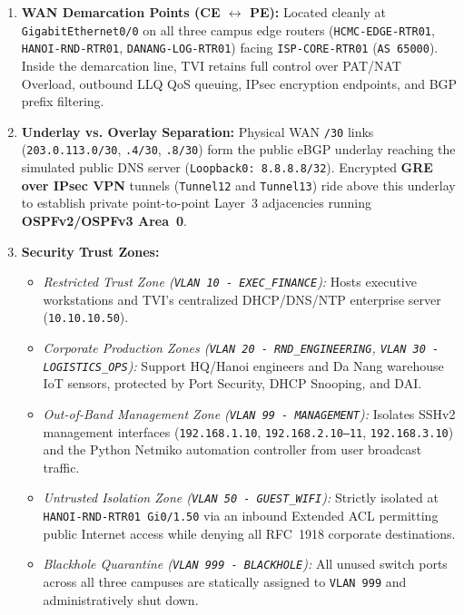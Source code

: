 \begin{enumerate}[leftmargin=1.5em, itemsep=3pt]
    \item \textbf{WAN Demarcation Points (CE $\leftrightarrow$ PE):} Located cleanly at \texttt{GigabitEthernet0/0} on all three campus edge routers (\texttt{HCMC-EDGE-RTR01}, \texttt{HANOI-RND-RTR01}, \texttt{DANANG-LOG-RTR01}) facing \texttt{ISP-CORE-RTR01} (\texttt{AS 65000}). Inside the demarcation line, TVI retains full control over PAT/NAT Overload, outbound LLQ QoS queuing, IPsec encryption endpoints, and BGP prefix filtering.
    \item \textbf{Underlay vs. Overlay Separation:} Physical WAN \texttt{/30} links (\texttt{203.0.113.0/30}, \texttt{.4/30}, \texttt{.8/30}) form the public eBGP underlay reaching the simulated public DNS server (\texttt{Loopback0: 8.8.8.8/32}). Encrypted \textbf{GRE over IPsec VPN} tunnels (\texttt{Tunnel12} and \texttt{Tunnel13}) ride above this underlay to establish private point-to-point Layer~3 adjacencies running \textbf{OSPFv2/OSPFv3 Area~0}.
    \item \textbf{Security Trust Zones:}
    \begin{itemize}[leftmargin=1.4em, itemsep=2pt]
        \item \emph{Restricted Trust Zone (\texttt{VLAN 10 - EXEC\_FINANCE}):} Hosts executive workstations and TVI's centralized DHCP/DNS/NTP enterprise server (\texttt{10.10.10.50}).
        \item \emph{Corporate Production Zones (\texttt{VLAN 20 - RND\_ENGINEERING}, \texttt{VLAN 30 - LOGISTICS\_OPS}):} Support HQ/Hanoi engineers and Da Nang warehouse IoT sensors, protected by Port Security, DHCP Snooping, and DAI.
        \item \emph{Out-of-Band Management Zone (\texttt{VLAN 99 - MANAGEMENT}):} Isolates SSHv2 management interfaces (\texttt{192.168.1.10}, \texttt{192.168.2.10--11}, \texttt{192.168.3.10}) and the Python Netmiko automation controller from user broadcast traffic.
        \item \emph{Untrusted Isolation Zone (\texttt{VLAN 50 - GUEST\_WIFI}):} Strictly isolated at \texttt{HANOI-RND-RTR01 Gi0/1.50} via an inbound Extended ACL permitting public Internet access while denying all RFC~1918 corporate destinations.
        \item \emph{Blackhole Quarantine (\texttt{VLAN 999 - BLACKHOLE}):} All unused switch ports across all three campuses are statically assigned to \texttt{VLAN 999} and administratively shut down.
    \end{itemize}
\end{enumerate}

